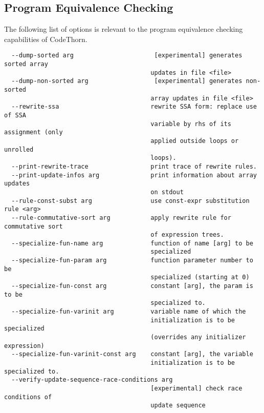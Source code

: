 \documentclass[natbib]{article}
\begin{document}
\subsection{Program Equivalence Checking}
The following list of options is relevant to the program equivalence checking capabilities of CodeThorn.
\begin{verbatim}
  --dump-sorted arg                      [experimental] generates sorted array 
                                        updates in file <file>
  --dump-non-sorted arg                  [experimental] generates non-sorted 
                                        array updates in file <file>
  --rewrite-ssa                         rewrite SSA form: replace use of SSA 
                                        variable by rhs of its assignment (only
                                        applied outside loops or unrolled 
                                        loops).
  --print-rewrite-trace                 print trace of rewrite rules.
  --print-update-infos arg              print information about array updates 
                                        on stdout
  --rule-const-subst arg                use const-expr substitution rule <arg>
  --rule-commutative-sort arg           apply rewrite rule for commutative sort
                                        of expression trees.
  --specialize-fun-name arg             function of name [arg] to be 
                                        specialized
  --specialize-fun-param arg            function parameter number to be 
                                        specialized (starting at 0)
  --specialize-fun-const arg            constant [arg], the param is to be 
                                        specialized to.
  --specialize-fun-varinit arg          variable name of which the 
                                        initialization is to be specialized 
                                        (overrides any initializer expression)
  --specialize-fun-varinit-const arg    constant [arg], the variable 
                                        initialization is to be specialized to.
  --verify-update-sequence-race-conditions arg
                                        [experimental] check race conditions of
                                        update sequence

\end{verbatim}
\end{document}
